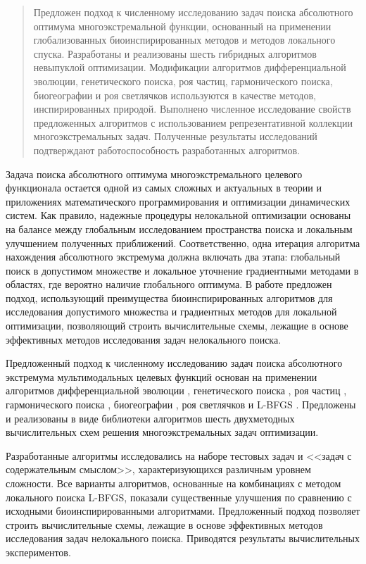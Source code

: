 \begin{abstract}
Предложен подход к численному исследованию задач поиска абсолютного оптимума многоэкстремальной функции, основанный на применении глобализованных биоинспирированных методов и методов локального спуска. Разработаны и реализованы шесть гибридных алгоритмов невыпуклой оптимизации. Модификации алгоритмов дифференциальной эволюции, генетического поиска, роя частиц, гармонического поиска, биогеографии и роя светлячков используются в качестве методов, инспирированных природой. Выполнено численное исследование свойств предложенных алгоритмов с использованием репрезентативной коллекции многоэкстремальных задач. Полученные результаты исследований подтверждают работоспособность разработанных алгоритмов.

\end{abstract}

Задача поиска абсолютного оптимума многоэкстремального целевого функционала остается одной из самых сложных и актуальных в теории и приложениях математического программирования и оптимизации динамических систем. Как правило, надежные процедуры нелокальной оптимизации основаны на балансе между глобальным исследованием пространства поиска и локальным улучшением полученных приближений. Соответственно, одна итерация алгоритма нахождения абсолютного экстремума должна включать два этапа: глобальный поиск в допустимом множестве и локальное уточнение градиентными методами в областях, где вероятно наличие глобального оптимума. В работе предложен подход, использующий преимущества биоинспирированных алгоритмов для исследования допустимого множества и градиентных методов для локальной оптимизации, позволяющий строить вычислительные схемы, лежащие в основе эффективных методов исследования задач нелокального поиска.

Предложенный подход к численному исследованию задач поиска абсолютного экстремума мультимодальных целевых функций основан на применении алгоритмов дифференциальной эволюции \cite{Storn}, генетического поиска \cite{Whitley}, роя частиц \cite{Liu}, гармонического поиска \cite{Geem}, биогеографии \cite{Simon}, роя светлячков \cite{Yang} и L-BFGS \cite{Mokhtari}. Предложены и реализованы в виде библиотеки алгоритмов шесть двухметодных вычислительных схем решения многоэкстремальных задач оптимизации.

Разработанные алгоритмы исследовались на наборе тестовых задач и <<задач с содержательным смыслом>>, характеризующихся различным уровнем сложности. Все варианты алгоритмов, основанные на комбинациях с методом локального поиска L-BFGS, показали существенные улучшения по сравнению с исходными биоинспирированными алгоритмами. Предложенный подход позволяет строить вычислительные схемы, лежащие в основе эффективных методов исследования задач нелокального поиска. Приводятся результаты вычислительных экспериментов.


